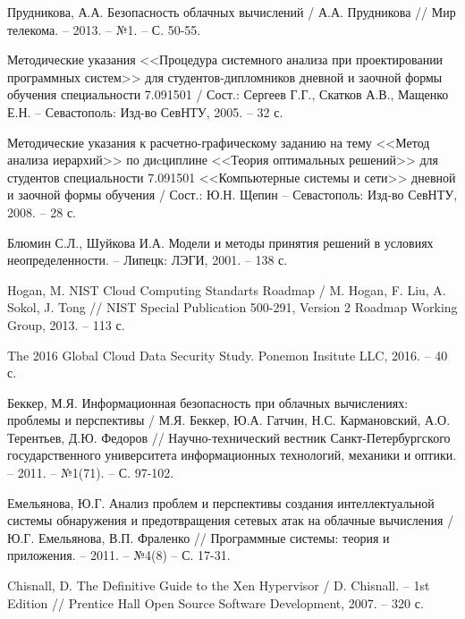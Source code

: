 \begingroup 
\renewcommand{\section}[2]{\anonsection{Библиографический список}}
\begin{thebibliography}{00}

    Прудникова, А.А.
    Безопасность облачных вычислений /
    А.А. Прудникова //
    Мир телекома. -- 2013. -- №1. -- С. 50-55.

    Методические указания <<Процедура системного анализа при проектировании программных систем>>
    для студентов-дипломников дневной и заочной формы обучения специальности 7.091501 /
    Сост.: Сергеев Г.Г., Скатков А.В., Мащенко Е.Н. -- Севастополь:
    Изд-во СевНТУ, 2005. -- 32 с.

    Методические указания к расчетно-графическому заданию
    на тему <<Метод анализа иерархий>>  по диcциплине <<Теория оптимальных решений>>
    для студентов специальности 7.091501 <<Компьютерные системы и сети>>
    дневной и заочной формы обучения /
    Сост.: Ю.Н. Щепин -- Севастополь:
    Изд-во СевНТУ, 2008. -- 28 с.

    Блюмин С.Л., Шуйкова И.А.
    Модели и методы принятия решений в условиях неопределенности. --
    Липецк: ЛЭГИ, 2001. -- 138 с.

    Hogan, M.
    NIST Cloud Computing Standarts Roadmap /
    M. Hogan, F. Liu, A. Sokol, J. Tong //
    NIST Special Publication 500-291, Version 2
    Roadmap Working Group, 2013. -- 113 с.

    The 2016 Global Cloud Data Security Study.
    Ponemon Insitute LLC, 2016. -- 40 с.

    Беккер, М.Я.
    Информационная безопасность при облачных вычислениях: проблемы и перспективы /
    М.Я. Беккер, Ю.А. Гатчин, Н.С. Кармановский, А.О. Терентьев, Д.Ю. Федоров //
    Научно-технический вестник Санкт-Петербургского государственного университета информационных технологий, механики и оптики. -- 2011. -- №1(71). -- С. 97-102.

    Емельянова, Ю.Г.
    Анализ проблем и перспективы создания интеллектуальной системы обнаружения и предотвращения сетевых атак на облачные вычисления /
    Ю.Г. Емельянова, В.П. Фраленко //
    Программные системы: теория и приложения. -- 2011. -- №4(8) -- С. 17-31.

    Chisnall, D.
    The Definitive Guide to the Xen Hypervisor /
    D. Chisnall. --
    1st Edition //
    Prentice Hall Open Source Software Development, 2007. -- 320 с.


\end{thebibliography}
